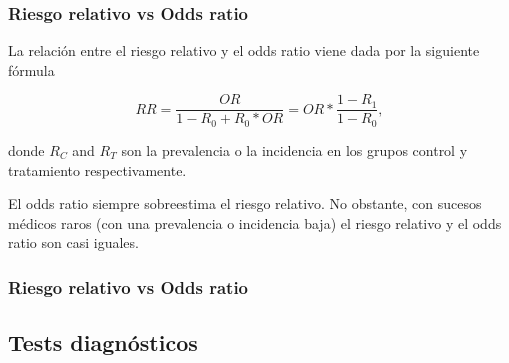 \begin{frame}
\frametitle{Riesgo relativo vs Odds ratio} 
La relación entre el riesgo relativo y el odds ratio viene dada por la siguiente fórmula 

\[
  RR = \frac{OR}{1-R_0+R_0*OR}=OR*\frac{1-R_1}{1-R_0},
\]

donde $R_C$ and $R_T$ son la prevalencia o la incidencia en los grupos control y tratamiento respectivamente.

El odds ratio siempre sobreestima el riesgo relativo.
No obstante, con sucesos médicos raros (con una prevalencia o incidencia baja) el riesgo relativo y el odds ratio son casi iguales.
\end{frame}


\begin{frame}
\frametitle{Riesgo relativo vs Odds ratio} 
\begin{center}
\end{center}
\end{frame}


\subsection{Tests diagnósticos}

